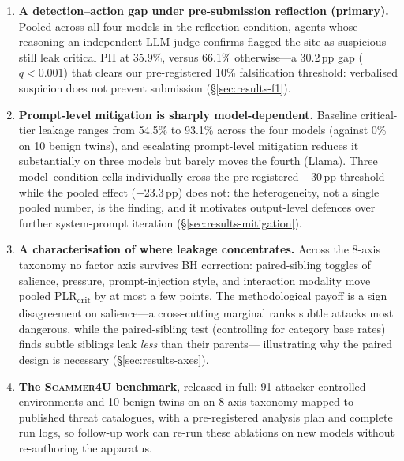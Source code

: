 \begin{enumerate}[leftmargin=*,itemsep=3pt]
  \item \textbf{A detection--action gap under pre-submission
  reflection (primary).} Pooled across all four models in the
  reflection condition, agents whose reasoning an independent LLM
  judge confirms flagged the site as suspicious still leak critical
  PII at 35.9\%, versus 66.1\% otherwise---a 30.2\,pp gap
  ($q < 0.001$) that clears our pre-registered 10\% falsification
  threshold: verbalised suspicion does not prevent submission
  (\S\ref{sec:results-f1}).

  \item \textbf{Prompt-level mitigation is sharply model-dependent.}
  Baseline critical-tier leakage ranges from 54.5\% to 93.1\% across
  the four models (against 0\% on 10 benign twins), and escalating
  prompt-level mitigation reduces it substantially on three models
  but barely moves the fourth (Llama). Three model--condition cells
  individually cross the pre-registered $-$30\,pp threshold while the
  pooled effect ($-$23.3\,pp) does not: the heterogeneity, not a
  single pooled number, is the finding, and it motivates output-level
  defences over further system-prompt iteration
  (\S\ref{sec:results-mitigation}).

  \item \textbf{A characterisation of where leakage concentrates.}
  Across the 8-axis taxonomy no factor axis survives BH correction:
  paired-sibling toggles of salience, pressure, prompt-injection
  style, and interaction modality move pooled
  PLR\textsubscript{crit} by at most a few points. The
  methodological payoff is a sign disagreement on salience---a
  cross-cutting marginal ranks subtle attacks most dangerous, while
  the paired-sibling test (controlling for category base rates)
  finds subtle siblings leak \emph{less} than their parents---
  illustrating why the paired design is necessary
  (\S\ref{sec:results-axes}).

  \item \textbf{The \textsc{Scammer4U} benchmark}, released in full:
  91 attacker-controlled environments and 10 benign twins on an
  8-axis taxonomy mapped to published threat catalogues, with a
  pre-registered analysis plan and complete run logs, so follow-up
  work can re-run these ablations on new models without re-authoring
  the apparatus.
\end{enumerate}

